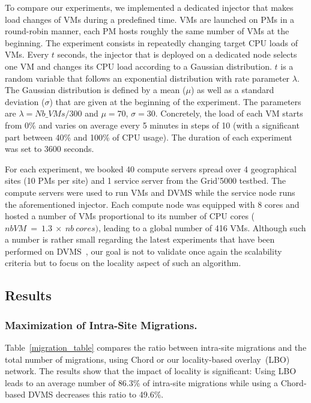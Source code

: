 To compare our experiments, we implemented a dedicated injector that makes load changes of
VMs during a predefined time. VMs are launched on PMs in a round-robin manner, \ie each
PM hosts roughly the same number of VMs at the beginning. The experiment consists in
repeatedly changing target CPU loads of VMs. Every $t$ seconds, the injector that is
deployed on a dedicated node selects one VM and changes its CPU load according to a
Gaussian distribution. $t$ is a random variable that follows an exponential distribution
with rate parameter $\lambda$. The Gaussian distribution is defined by a mean ($\mu$) as
well as a standard deviation ($\sigma$) that are given at the beginning of the experiment.
The parameters are $\lambda=\mathit{Nb\_VMs}/300$ and $\mu=70$, $\sigma=30$.
Concretely, the load of each VM starts from 0\% and varies on average every 5
minutes in steps of 10 (with a significant part between 40\% and 100\% of CPU
usage). The duration of each experiment was set to 3600 seconds.

For each experiment, we booked 40 compute servers spread over 4 geographical sites (10
PMs per site) and 1 service server from the Grid'5000 testbed. The compute servers
were used to run VMs and DVMS while the service node runs the aforementioned
injector.
%
Each compute node was equipped with 8 cores and hosted a number of VMs
proportional to its number of CPU cores ($nb VM\ =\ 1.3\ \times\ nb\ cores)$, leading to
a global number of 416 VMs. Although such a number is rather small regarding the latest
experiments that have been performed on DVMS~\cite{quesnel:ispa2013}, our goal is not to
validate once again the scalability criteria but to focus on the locality aspect of such
an algorithm.

\subsection{Results}

\subsubsection{Maximization of Intra-Site Migrations.}

Table~\ref{migration_table} compares the ratio between intra-site migrations and the total
number of migrations, using Chord or our locality-based overlay~(LBO) network. The results show that the impact of locality
is significant: Using LBO leads to an average number of 86.3\%
of intra-site migrations while using a Chord-based DVMS decreases this ratio to 49.6\%.

